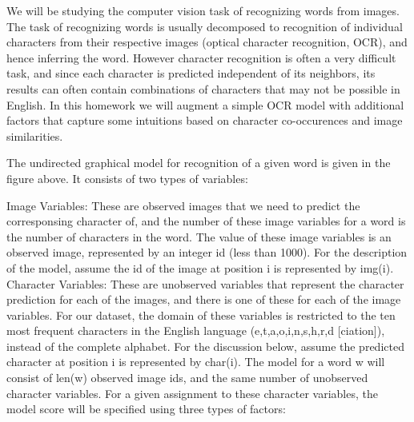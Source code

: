 We will be studying the computer vision task of recognizing words from images. The task of recognizing words is usually decomposed to recognition of individual characters from their respective images (optical character recognition, OCR), and hence inferring the word. However character recognition is often a very difficult task, and since each character is predicted independent of its neighbors, its results can often contain combinations of characters that may not be possible in English. In this homework we will augment a simple OCR model with additional factors that capture some intuitions based on character co-occurences and image similarities.



The undirected graphical model for recognition of a given word is given in the figure above. It consists of two types of variables:

Image Variables: These are observed images that we need to predict the corresponsing character of, and the number of these image variables for a word is the number of characters in the word. The value of these image variables is an observed image, represented by an integer id (less than 1000). For the description of the model, assume the id of the image at position i is represented by img(i).
Character Variables: These are unobserved variables that represent the character prediction for each of the images, and there is one of these for each of the image variables. For our dataset, the domain of these variables is restricted to the ten most frequent characters in the English language ({e,t,a,o,i,n,s,h,r,d} [ciation]), instead of the complete alphabet. For the discussion below, assume the predicted character at position i is represented by char(i).
The model for a word w will consist of len(w) observed image ids, and the same number of unobserved character variables. For a given assignment to these character variables, the model score will be specified using three types of factors:

